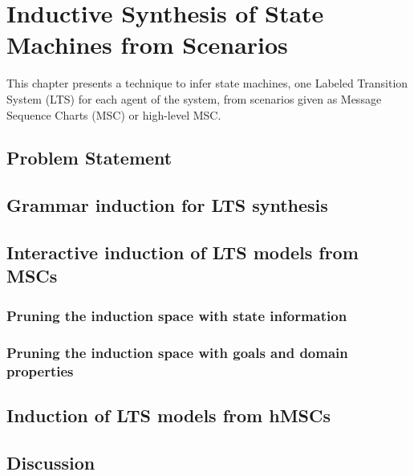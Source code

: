 \chapter{Inductive Synthesis of State Machines from Scenarios\label{chapter:inductive-synthesis}}

This chapter presents a technique to infer state machines, one Labeled Transition System (LTS) for each agent of the system, from scenarios given as Message Sequence Charts (MSC) or high-level MSC.


\section{Problem Statement}



\section{Grammar induction for LTS synthesis\label{section:inductive-background}}




\section{Interactive induction of LTS models from MSCs}

\subsection{Pruning the induction space with state information}

\subsection{Pruning the induction space with goals and domain properties}


\section{Induction of LTS models from hMSCs\label{section:inductive-from-hMSC}}

\section{Discussion\label{section:inductive-discussion}}
